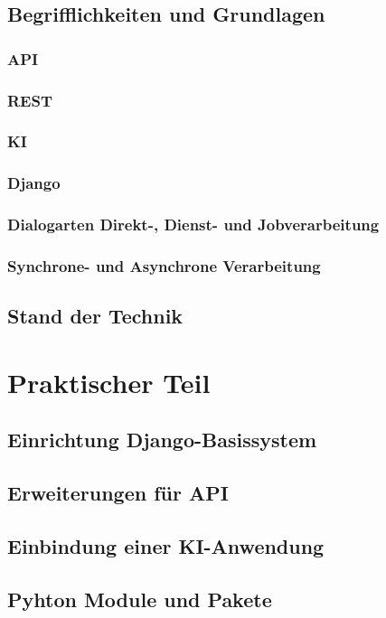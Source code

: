 \documentclass[12pt,oneside,titlepage,listof=totoc,bibliography=totoc]{scrartcl}
\begin{document}
 \subsection{Begrifflichkeiten und Grundlagen}
  \subsubsection{API}
  \subsubsection{REST}
  \subsubsection{KI}
  \subsubsection{Django}
  \subsubsection{Dialogarten Direkt-, Dienst- und Jobverarbeitung}
  \subsubsection{Synchrone- und Asynchrone Verarbeitung}
 \subsection{Stand der Technik}

\section{Praktischer Teil}
 \subsection{Einrichtung Django-Basissystem }
 \subsection{Erweiterungen für API}
 \subsection{Einbindung einer KI-Anwendung}
  \subsection{Pyhton Module und Pakete}
\end{document}
